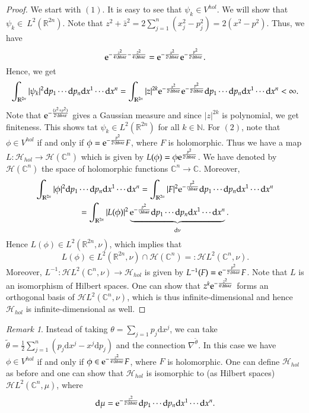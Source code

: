 \documentclass[11pt]{amsart}
\numberwithin{equation}{section}
\theoremstyle{plain}
\theoremstyle{definition}
\theoremstyle{remark}
\newtheorem{rem}{Remark}[subsection]
\newcommand{\R}{\mathbb{R}}
\newcommand{\N}{\mathbb{N}}
\newcommand{\dd}{{\mathrm{d}}}
\newcommand{\calH}{\mathcal{H}}
\newcommand{\ee}{\textnormal{e}}
\begin{document}
\begin{proof}
We start with $(1)$. It is easy to see that $\psi_k\in V^{hol}$. We will show that $\psi_k\in\ L^2(\R^{2n})$. Note that $z^2+\bar z^2=2\sum_{j=1}^n(x_j^2-p_j^2)=2(x^2-p^2)$. Thus, we have $$\ee^{-\frac{z^2}{4\hbar}-\frac{\bar z^2}{4\hbar}}=\ee^{-\frac{x^2}{2\hbar}}\ee^{-\frac{p^2}{2\hbar}}.$$ Hence, we get
$$\int_{\R^{2n}}\vert \psi_k\vert^2\dd p_1\dotsm\dd p_n\dd x^{1}\dotsm\dd x^n=\int_{\R^{2n}}\vert z\vert^{2k}\ee^{-\frac{x^2}{2\hbar}}\ee^{-\frac{p^2}{2\hbar}}\dd p_1\dotsm\dd p_n\dd x^{1}\dotsm\dd x^n<\infty.$$
Note that $\ee^{-\frac{(x^2+p^2)}{2\hbar}}$ gives a Gaussian measure and since $\vert z\vert^{2k}$ is polynomial, we get finiteness. This shows tat $\psi_k\in L^2(\R^{2n})$ for all $k\in\N$. For $(2)$, note that $\phi\in V^{hol}$ if and only if $\phi=\ee^{-\frac{p^2}{2\hbar}}F$, where $F$ is holomorphic. Thus we have a map $L\colon\calH_{hol}\to \mathscr{H}(\mathbb{C}^n)$ which is given by $L(\phi)=\phi\ee^{\frac{p^2}{2\hbar}}$. We have denoted by $\mathscr{H}(\mathbb C^n)$ the space of holomorphic functions $\mathbb C^n\to \mathbb C$. Moreover, 
\begin{multline*}
\int_{\R^{2n}}\vert\phi\vert^2\dd p_1\dotsm\dd p_n\dd x^{1}\dotsm\dd x^n=\int_{\R^{2n}}\vert F\vert^2\ee^{-\frac{p^2}{\hbar}}\dd p_1\dotsm\dd p_n\dd x^{1}\dotsm\dd x^n\\=\int_{\R^{2n}}\vert L(\phi)\vert^2\underbrace{\ee^{-\frac{p^2}{\hbar}}\dd p_1\dotsm\dd p_n\dd x^{1}\dotsm\dd x^n}_{\dd\nu}.
\end{multline*}
Hence $L(\phi)\in L^2(\R^{2n},\nu)$, which implies that 
\[
L(\phi)\in L^2(\R^{2n},\nu)\cap \mathscr{H}(\mathbb{C}^n)=:\mathscr{H}L^2(\mathbb{C}^n,\nu).
\]
Moreover, $L^{-1}\colon \mathscr{H}L^2(\mathbb{C}^n,\nu)\to \calH_{hol}$ is given by $L^{-1}(F)=\ee^{-\frac{p^2}{2\hbar}}F$. Note that $L$ is an isomorphism of Hilbert spaces. One can show that $z^k\ee^{-\frac{z^2}{4\hbar}}$ forms an orthogonal basis of $\mathscr{H}L^2(\mathbb{C}^n,\nu)$, which is thus infinite-dimensional and hence $\calH_{hol}$ is infinite-dimensional as well. 
\end{proof}

\begin{rem}
\label{rem_theta}
Instead of taking $\theta=\sum_{j=1}p_j\dd x^j$, we can take $\widetilde{\theta}=\frac{1}{2}\sum_{j=1}^n(p_j\dd x^j-x^j\dd p_j)$ and the connection $\nabla^{\widetilde{\theta}}$. In this case we have $\phi\in V^{hol}$ if and only if $\phi\in\ee^{-\frac{z^2}{4\hbar}}F$, where $F$ is holomorphic. One can define $\calH_{hol}$ as before and one can show that $\calH_{hol}$ is isomorphic to (as Hilbert spaces) $\mathscr{H}L^2(\mathbb{C}^n,\mu)$, where 
\[
\dd\mu=\ee^{-\frac{z^2}{2\hbar}}\dd p_1\dotsm \dd p_n\dd x^1\dotsm \dd x^n.
\]
\end{rem}
\end{document}
